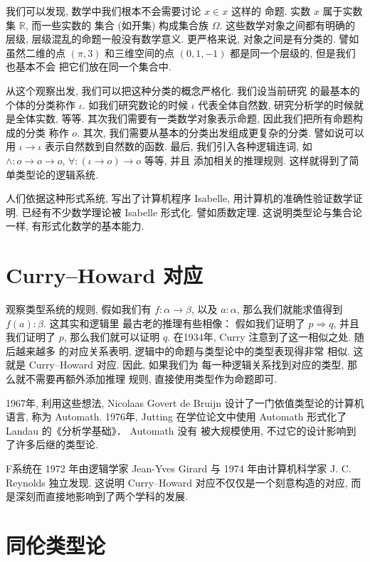 \documentclass[UTF8, zihao=-4]{ctexart}
\theoremstyle{plain}
\theoremstyle{definition}
\theoremstyle{remark}
\begin{document}
我们可以发现, 数学中我们根本不会需要讨论 \(x \in x\) 这样的
命题. 实数 \(x\) 属于实数集 \(\mathbb R\), 而一些实数的
集合 (如开集) 构成集合族 \(\Omega\). 这些数学对象之间都有明确的层级,
层级混乱的命题一般没有数学意义.
更严格来说, 对象之间是有分类的. 譬如虽然二维的点 \((\pi, 3)\)
和三维空间的点 \((0,1,-1)\) 都是同一个层级的, 但是我们也基本不会
把它们放在同一个集合中.

从这个观察出发, 我们可以把这种分类的概念严格化. 我们设当前研究
的最基本的个体的分类称作 \(\iota\). 如我们研究数论的时候
\(\iota\) 代表全体自然数, 研究分析学的时候就是全体实数, 等等.
其次我们需要有一类数学对象表示命题, 因此我们把所有命题构成的分类
称作 \(o\).
其次, 我们需要从基本的分类出发组成更复杂的分类. 譬如说可以用
\(\iota \to \iota\) 表示自然数到自然数的函数.
最后, 我们引入各种逻辑连词, 如 \(\wedge : o \to o \to o\),
\(\forall : (\iota \to o) \to o\)  等等, 并且
添加相关的推理规则. 这样就得到了简单类型论的逻辑系统.

人们依据这种形式系统, 写出了计算机程序 Isabelle,
用计算机的准确性验证数学证明. 已经有不少数学理论被 Isabelle 形式化.
譬如质数定理. 这说明类型论与集合论一样, 有形式化数学的基本能力.

\section*{Curry--Howard 对应}
观察类型系统的规则,
假如我们有 \(f : \alpha \to \beta\), 以及 \(a : \alpha\),
那么我们就能求值得到 \(f(a) : \beta\). 这其实和逻辑里
最古老的推理有些相像： 假如我们证明了 \(p\Rightarrow q\),
并且我们证明了 \(p\), 那么我们就可以证明 \(q\).
在1934年, Curry 注意到了这一相似之处. 随后越来越多
的对应关系表明, 逻辑中的命题与类型论中的类型表现得非常
相似. 这就是 Curry--Howard 对应. 因此, 如果我们为
每一种逻辑关系找到对应的类型, 那么就不需要再额外添加推理
规则, 直接使用类型作为命题即可.

1967年, 利用这些想法, Nicolaas Govert de Bruijn
设计了一门依值类型论的计算机语言, 称为 Automath.
1976年, Jutting 在学位论文中使用 Automath
形式化了 Landau 的《分析学基础》． Automath 没有
被大规模使用, 不过它的设计影响到了许多后继的类型论.

F系统在 1972 年由逻辑学家 Jean-Yves Girard
与 1974 年由计算机科学家 J. C. Reynolds 独立发现.
这说明 Curry--Howard 对应不仅仅是一个刻意构造的对应,
而是深刻而直接地影响到了两个学科的发展.

\section*{同伦类型论}
\end{document}
